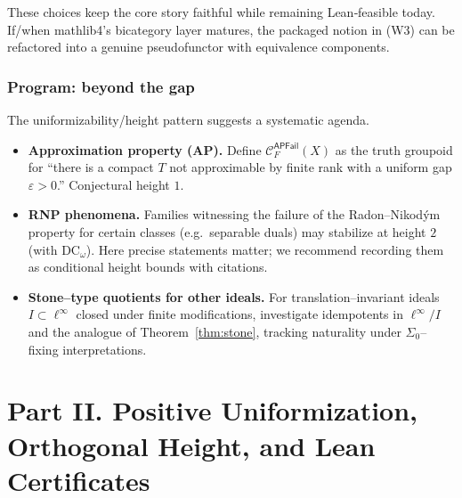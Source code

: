 \documentclass[11pt]{article}
\theoremstyle{definition}
\theoremstyle{remark}
\newcommand{\linf}{\ell^\infty}
\newcommand{\SigmaZero}{\Sigma_{0}}
\begin{document}
\medskip
\noindent
These choices keep the core story faithful while remaining Lean‑feasible today. If/when mathlib4’s bicategory layer matures, the packaged notion in (W3) can be refactored into a genuine pseudofunctor with equivalence components.

\section{Program: beyond the gap}\label{sec:program}

The uniformizability/height pattern suggests a systematic agenda.
\begin{itemize}
\item \textbf{Approximation property (AP).} Define \(\mathcal C^{\mathsf{APFail}}_F(X)\) as the truth groupoid for “there is a compact \(T\) not approximable by finite rank with a uniform gap \(\varepsilon>0\).” Conjectural height \(1\).
\item \textbf{RNP phenomena.} Families witnessing the failure of the Radon–Nikodým property for certain classes (e.g.\ separable duals) may stabilize at height \(2\) (with \(\mathrm{DC}_\omega\)). Here precise statements matter; we recommend recording them as conditional height bounds with citations.
\item \textbf{Stone--type quotients for other ideals.} For translation–invariant ideals \(I\subset\linf\) closed under finite modifications, investigate idempotents in \(\linf/I\) and the analogue of Theorem~\ref{thm:stone}, tracking naturality under \(\SigmaZero\)–fixing interpretations.
\end{itemize}

\part*{Part II. Positive Uniformization, Orthogonal Height, and Lean Certificates}

\newcommand{\ULpos}{\mathsf{UL}^{+}}         %
\newcommand{\Frontierpos}{\partial^{+}}      %
\newcommand{\Th}{\mathsf{Th}}
\newcommand{\Axis}{\mathcal{A}}
\newcommand{\Axes}{\mathcal{B}}
\newcommand{\NatSum}{\oplus}                 %
\end{document}

